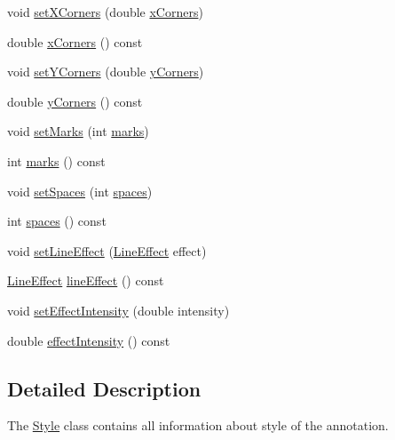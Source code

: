 \begin{DoxyCompactItemize}
\item 
void \hyperlink{classOkular_1_1Annotation_1_1Style_a779f3fb52625ebb8de7146d6cb3c186a}{set\+X\+Corners} (double \hyperlink{classOkular_1_1Annotation_1_1Style_a2484060394d36923abedeee5b8642abf}{x\+Corners})
\item 
double \hyperlink{classOkular_1_1Annotation_1_1Style_a2484060394d36923abedeee5b8642abf}{x\+Corners} () const 
\item 
void \hyperlink{classOkular_1_1Annotation_1_1Style_a5ed91a2e29863c5635ac891451f8449d}{set\+Y\+Corners} (double \hyperlink{classOkular_1_1Annotation_1_1Style_aad6acc210f09735dbb5b1566a5c7d8a7}{y\+Corners})
\item 
double \hyperlink{classOkular_1_1Annotation_1_1Style_aad6acc210f09735dbb5b1566a5c7d8a7}{y\+Corners} () const 
\item 
void \hyperlink{classOkular_1_1Annotation_1_1Style_a7a0cae54c5ea81a04d489b3cf9113190}{set\+Marks} (int \hyperlink{classOkular_1_1Annotation_1_1Style_a02d9e016fd04a0140622fb2b16dad1d9}{marks})
\item 
int \hyperlink{classOkular_1_1Annotation_1_1Style_a02d9e016fd04a0140622fb2b16dad1d9}{marks} () const 
\item 
void \hyperlink{classOkular_1_1Annotation_1_1Style_a18f041554611fa369b3af11b0c5e7d1a}{set\+Spaces} (int \hyperlink{classOkular_1_1Annotation_1_1Style_a31297a93ca0449f6e6dcfdf45a11c675}{spaces})
\item 
int \hyperlink{classOkular_1_1Annotation_1_1Style_a31297a93ca0449f6e6dcfdf45a11c675}{spaces} () const 
\item 
void \hyperlink{classOkular_1_1Annotation_1_1Style_abba8e87e3095dc7bcab862cf85854b6b}{set\+Line\+Effect} (\hyperlink{classOkular_1_1Annotation_a9083f89e7bb24e972852685dd2c6176e}{Line\+Effect} effect)
\item 
\hyperlink{classOkular_1_1Annotation_a9083f89e7bb24e972852685dd2c6176e}{Line\+Effect} \hyperlink{classOkular_1_1Annotation_1_1Style_ae5b30c68856419c27f472062f8ae5605}{line\+Effect} () const 
\item 
void \hyperlink{classOkular_1_1Annotation_1_1Style_a62d1a5e631a3e8d8c89ee12d199ed08c}{set\+Effect\+Intensity} (double intensity)
\item 
double \hyperlink{classOkular_1_1Annotation_1_1Style_a82b92621f17f0762a2341fe79fdd62f5}{effect\+Intensity} () const 
\end{DoxyCompactItemize}


\subsection{Detailed Description}
The \hyperlink{classOkular_1_1Annotation_1_1Style}{Style} class contains all information about style of the annotation. 

